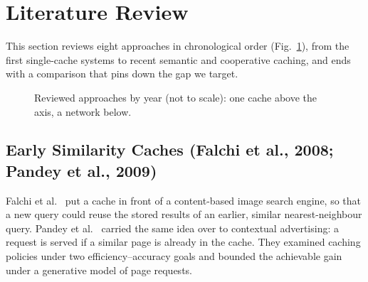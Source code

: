 \documentclass[11pt,a4paper]{article}
\begin{document}
\section{Literature Review}\label{sec:lit}

This section reviews eight approaches in chronological order (Fig.~\ref{fig:timeline}), from the
first single-cache systems to recent semantic and cooperative caching, and ends with a comparison
that pins down the gap we target.

\begin{figure}[H]
\centering
{}
\caption{Reviewed approaches by year (not to scale): one cache above the axis, a network below.}
\label{fig:timeline}
\end{figure}

\subsection{Early Similarity Caches (Falchi et al., 2008; Pandey et al., 2009)}
Falchi et al.~\cite{falchi2008metric} put a cache in front of a content-based image search engine, so
that a new query could reuse the stored results of an earlier, similar nearest-neighbour query.
Pandey et al.~\cite{pandey2009nn} carried the same idea over to contextual advertising: a request is
served if a similar page is already in the cache. They examined caching policies under two
efficiency--accuracy goals and bounded the achievable gain under a generative model of page requests.
\end{document}
